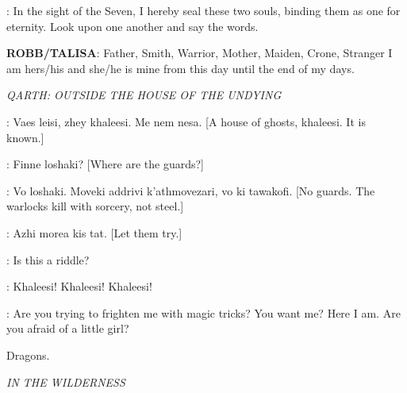 \SEPTON: In the sight of the Seven, I hereby seal these two souls, binding them as one for eternity. Look upon one another and say the words. 

\textbf{ROBB/TALISA}: Father, Smith, Warrior, Mother, Maiden, Crone, Stranger I am hers/his and she/he is mine from this day until the end of my days. 



\scene

\textit{QARTH: OUTSIDE THE HOUSE OF THE UNDYING} 


\KOVARRO: Vaes leisi, zhey khaleesi. Me nem nesa. [A house of ghosts, khaleesi. It is known.]


\KOVARRO: Finne loshaki? [Where are the guards?] 

\JORAH: Vo loshaki. Moveki addrivi k'athmovezari, vo ki tawakofi. [No guards. The warlocks kill with sorcery, not steel.] 

\DAENERYS: Azhi morea kis tat. [Let them try.] 


\DAENERYS: Is this a riddle? 


\JORAH:  Khaleesi! Khaleesi! Khaleesi! 


\DAENERYS: Are you trying to frighten me with magic tricks? You want me? Here I am. Are you afraid of a little girl?

\sfx Dragons.



\scene

\textit{IN THE WILDERNESS}


